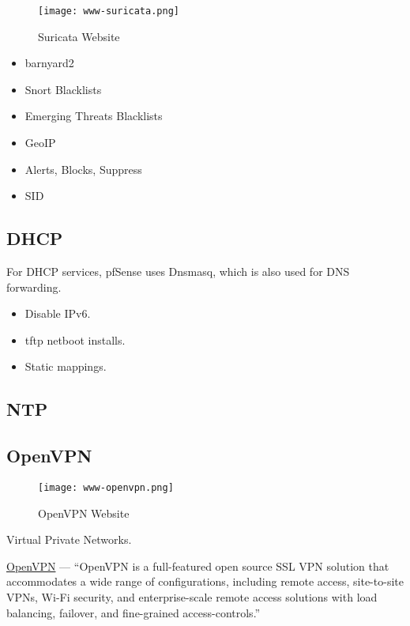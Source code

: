\begin{figure}[h!]
\texttt{[image: www-suricata.png]}
 \caption{Suricata Website}
 \label{fig:www-suricata}
\end{figure}

\begin{itemize}
 \item barnyard2
 \item Snort Blacklists
 \item Emerging Threats Blacklists
 \item GeoIP
 \item Alerts, Blocks, Suppress
 \item SID
\end{itemize}


\subsection{DHCP}
For DHCP services, pfSense uses Dnsmasq, which is also used for DNS
forwarding.

\begin{itemize}
 \item Disable IPv6.
 \item tftp netboot installs.
 \item Static mappings.
\end{itemize}


\subsection{NTP}


\subsection{OpenVPN}
\begin{figure}[h!]
\texttt{[image: www-openvpn.png]}
 \caption{OpenVPN Website}
 \label{fig:www-openvpn}
\end{figure}


Virtual Private Networks.


\href{https://www.openvpn.net/}{OpenVPN} --- ``OpenVPN is a full-featured open source SSL VPN solution that accommodates a wide range of configurations, including remote access, site-to-site VPNs, Wi-Fi security, and enterprise-scale remote access solutions with load balancing, failover, and fine-grained access-controls.''

